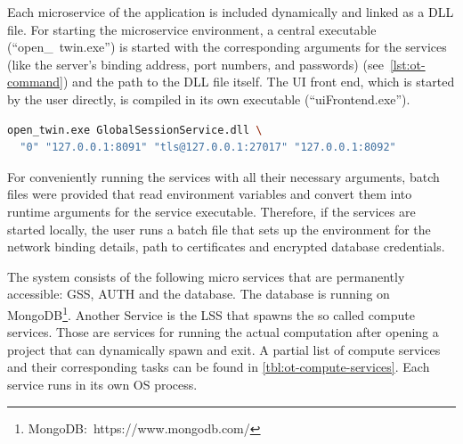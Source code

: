 Each microservice of the application is included dynamically and linked as a \ac{DLL} file. For starting the microservice environment, a central executable (\enquote{open\_\ twin.exe}) is started with the corresponding arguments for the services (like the server's binding address, port numbers, and passwords) (see~\autoref{lst:ot-command}) and the path to the \ac{DLL} file itself. The UI front end, which is started by the user directly, is compiled in its own executable (\enquote{uiFrontend.exe}).

\begin{lstlisting}[language=sh, caption={Command line of Open Twin Service start}, label=lst:ot-command]
open_twin.exe GlobalSessionService.dll \
  "0" "127.0.0.1:8091" "tls@127.0.0.1:27017" "127.0.0.1:8092"
\end{lstlisting}

For conveniently running the services with all their necessary arguments, batch files were provided that read environment variables and convert them into runtime arguments for the service executable. Therefore, if the services are started locally, the user runs a batch file that sets up the environment for the network binding details, path to certificates and encrypted database credentials.

The system consists of the following micro services that are permanently accessible: \acf{GSS}, \acf{AUTH} and the database. The database is running on MongoDB\footnote{MongoDB:~https://www.mongodb.com/}. Another Service is the \acf{LSS} that spawns the so called compute services. Those are services for running the actual computation after opening a project that can dynamically spawn and exit. A partial list of compute services and their corresponding tasks can be found in \autoref{tbl:ot-compute-services}.
Each service runs in its own \ac{OS} process.

